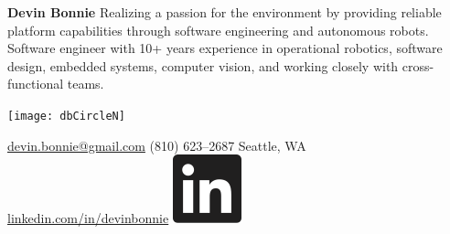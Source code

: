\documentclass[11pt,twoside,a4paper]{article}
\begin{document}
    \renewcommand{\labelitemi}{\tiny$\bullet$} {
        \hspace{-12px}
        \begin{minipage}[t]{0.33\textwidth}
            \begin{flushleft}
                \noindent
                \textbf{\fontsize{18}{0}\selectfont Devin Bonnie}
                \vspace{7px}
                \linebreak
                \noindent
                Realizing a passion for the environment by providing reliable platform capabilities through software engineering and autonomous robots. Software engineer with 10+ years experience in operational robotics, software design, embedded systems, computer vision, and working closely with cross-functional teams.
                \vspace*{1\baselineskip}
            \end{flushleft}
        \end{minipage}
        \begin{minipage}[c]{0.33\textwidth}
            \begin{center}
                \texttt{[image: dbCircleN]}
            \end{center}
        \end{minipage}
        \begin{minipage}[t]{0.33\textwidth}
            \begin{flushright}
                \vspace*{1.75\baselineskip}
                \href{mailto:devin.bonnie@gmail.com}{devin.bonnie@gmail.com}  \space\space \Letter
                 \vspace{1px}
                \linebreak
                (810) 623--2687 \space\space \Telefon
                 \vspace{1px}
                \linebreak
                Seattle,  WA \space\space \Mundus
                 \vspace{1px}
                \linebreak
                \href{https://www.linkedin.com/in/devinbonnie}{linkedin.com/in/devinbonnie} \space\space \includegraphics[scale=0.40]{linkedin}\hspace{.9px}

\end{flushright}
\end{minipage}}
\end{document}
